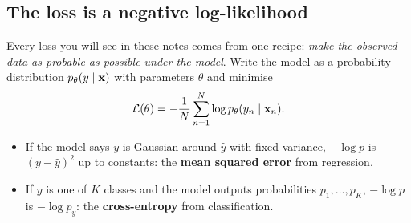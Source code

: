 \subsection{The loss is a negative log-likelihood}
Every loss you will see in these notes comes from one recipe: \emph{make the observed data as probable as possible under the model}. Write the model as a probability distribution $p_\theta(y\mid\mathbf{x})$ with parameters $\theta$ and minimise
\begin{equation}
\mathcal L(\theta) = -\frac1N\sum_{n=1}^N \log p_\theta(y_n\mid \mathbf{x}_n).\label{eq:nll}
\end{equation}
\begin{itemize}
\item If the model says $y$ is Gaussian around $\hat y$ with fixed variance, $-\log p$ is $(y-\hat y)^2$ up to constants: the \textbf{mean squared error} from regression.
\item If $y$ is one of $K$ classes and the model outputs probabilities $p_1,\dots,p_K$, $-\log p$ is $-\log p_{y}$: the \textbf{cross-entropy} from classification.
\end{itemize}

